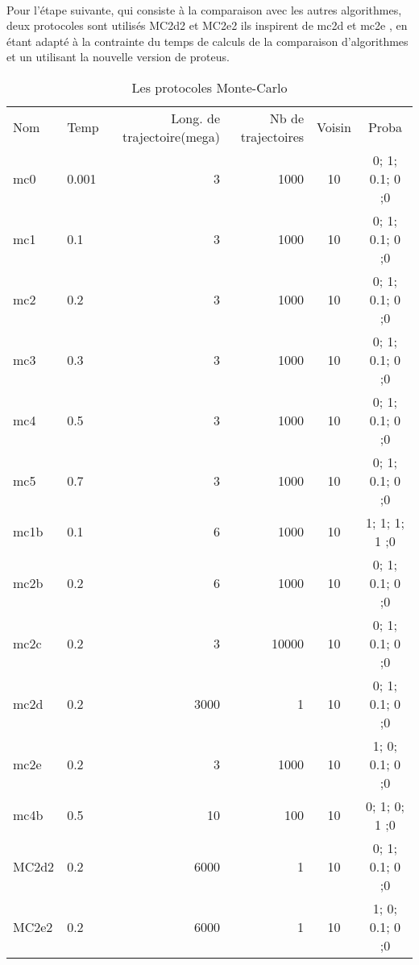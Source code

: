 \paragraph{}
Pour l'étape suivante, qui consiste à la comparaison avec les autres algorithmes, deux protocoles sont utilisés MC2d2 et MC2e2 ils inspirent de mc2d et mc2e , en étant adapté à la contrainte du temps de calculs de la comparaison d'algorithmes et un utilisant la nouvelle version de proteus. 
  

    \begin{table}[!htbp]
      \centering

      \begin{tabular}{llrrcc}

        \toprule
        Nom & Temp & Long. de trajectoire(mega) & Nb de trajectoires  & Voisin & Proba \\
        \cmidrule{1-6}
        mc0   & 0.001 &  3  &  1000  & 10 & 0; 1; 0.1; 0 ;0 \\      
        mc1   & 0.1   &  3  &  1000  & 10 & 0; 1; 0.1; 0 ;0 \\  
        mc2   & 0.2   &  3  &  1000  & 10 & 0; 1; 0.1; 0 ;0 \\ 
        mc3   & 0.3   &  3  &  1000  & 10 & 0; 1; 0.1; 0 ;0 \\               
        mc4   & 0.5   &  3  &  1000  & 10 & 0; 1; 0.1; 0 ;0 \\  
        mc5   & 0.7   &  3  &  1000  & 10 & 0; 1; 0.1; 0 ;0 \\  
        mc1b  & 0.1   &  6  &  1000  & 10 & 1; 1;   1; 1 ;0 \\  
        mc2b  & 0.2   &  6  &  1000  & 10 & 0; 1; 0.1; 0 ;0 \\      
        mc2c  & 0.2   &  3  & 10000  & 10 & 0; 1; 0.1; 0 ;0 \\   
        mc2d  & 0.2   &  3000  &  1 & 10  & 0; 1; 0.1; 0 ;0 \\ 
        mc2e  & 0.2   &  3  &  1000  & 10 & 1; 0; 0.1; 0 ;0 \\     
        mc4b  & 0.5   & 10  &   100  & 10 & 0; 1;   0; 1 ;0 \\
        \cmidrule{1-6}         
        MC2d2 & 0.2   &  6000  &  1  & 10 & 0; 1; 0.1; 0 ;0 \\      
        MC2e2 & 0.2   &  6000  &  1  & 10 & 1; 0; 0.1; 0 ;0 \\   

        \bottomrule   

        
      \end{tabular}      
      \caption{Les protocoles Monte-Carlo}
\label{tab:protoMC}      
    \end{table}


